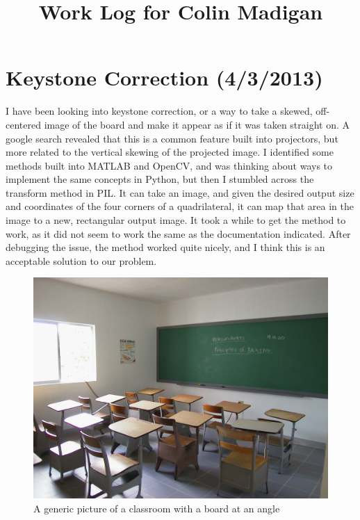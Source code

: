 \documentclass[]{article}
\begin{document}
\title{Work Log for Colin Madigan}
\date{}
\maketitle
	\tableofcontents
\newpage

	\section{Keystone Correction (4/3/2013)}
		I have been looking into keystone correction, or a way to take a skewed, off-centered image of the board and make it appear as if it was taken straight on.  A google search revealed that this is a common feature built into projectors, but more related to the vertical skewing of the projected image.  I identified some methods built into MATLAB and OpenCV, and was thinking about ways to implement the same concepts in Python, but then I stumbled across the transform method in PIL.  It can take an image, and given the desired output size and coordinates of the four corners of a quadrilateral, it can map that area in the image to a new, rectangular output image.  It took a while to get the method to work, as it did not seem to work the same as the documentation indicated.  After debugging the issue, the method worked quite nicely, and I think this is an acceptable solution to our problem.  
	
\begin{figure}[H]
\centering
\includegraphics[scale=0.4]{images/classroom}
\caption{A generic picture of a classroom with a board at an angle}
\end{figure}	
\end{document}
